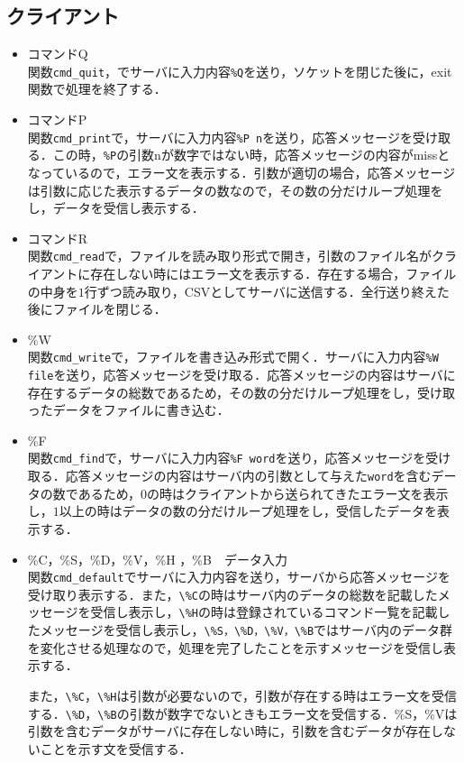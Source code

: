 \documentclass{jarticle}[11pt]
\begin{document}
\subsection{クライアント}
\begin{itemize}
\item コマンドQ \\
  関数\verb|cmd_quit|，でサーバに入力内容\verb|%Q|を送り，ソケットを閉じた後に，exit関数で処理を終了する．

\item コマンドP \\
  関数\verb|cmd_print|で，サーバに入力内容\verb|%P n|を送り，応答メッセージを受け取る．この時，\verb|%P|の引数nが数字ではない時，応答メッセージの内容がmissとなっているので，エラー文を表示する．引数が適切の場合，応答メッセージは引数に応じた表示するデータの数なので，その数の分だけループ処理をし，データを受信し表示する．

\item コマンドR \\
関数\verb|cmd_read|で，ファイルを読み取り形式で開き，引数のファイル名がクライアントに存在しない時にはエラー文を表示する．存在する場合，ファイルの中身を$1$行ずつ読み取り，CSVとしてサーバに送信する．全行送り終えた後にファイルを閉じる．

\item \%W \\
関数\verb|cmd_write|で，ファイルを書き込み形式で開く．サーバに入力内容\verb|%W file|を送り，応答メッセージを受け取る．応答メッセージの内容はサーバに存在するデータの総数であるため，その数の分だけループ処理をし，受け取ったデータをファイルに書き込む．

\item \%F \\
関数\verb|cmd_find|で，サーバに入力内容\verb|%F word|を送り，応答メッセージを受け取る．応答メッセージの内容はサーバ内の引数として与えた\verb|word|を含むデータの数であるため，$0$の時はクライアントから送られてきたエラー文を表示し，$1$以上の時はデータの数の分だけループ処理をし，受信したデータを表示する．

\item \%C，\%S，\%D，\%V，\%H ，\%B　データ入力\\
  関数\verb|cmd_default|でサーバに入力内容を送り，サーバから応答メッセージを受け取り表示する．また，\verb|\%C|の時はサーバ内のデータの総数を記載したメッセージを受信し表示し，\verb|\%H|の時は登録されているコマンド一覧を記載したメッセージを受信し表示し，\verb|\%S，\%D，\%V，\%B|ではサーバ内のデータ群を変化させる処理なので，処理を完了したことを示すメッセージを受信し表示する．

また，\verb|\%C|，\verb|\%H|は引数が必要ないので，引数が存在する時はエラー文を受信する．\verb|\%D|，\verb|\%B|の引数が数字でないときもエラー文を受信する．\%S，\%Vは引数を含むデータがサーバに存在しない時に，引数を含むデータが存在しないことを示す文を受信する．

\end{itemize}
\end{document}
